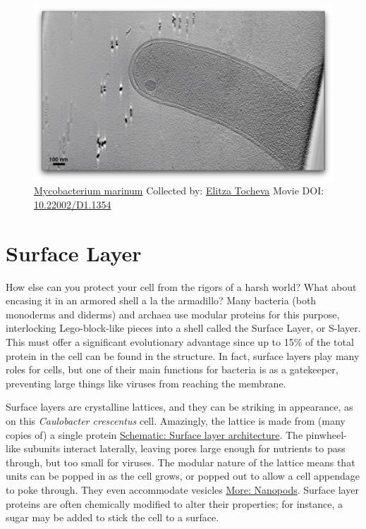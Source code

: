 \documentclass[]{tufte-book}
\begin{document}
\begin{figure}
\includegraphics{movie_stills/2_5} \caption[\protect\hyperlink{tree}{Mycobacterium marinum} Collected by:
\protect\hyperlink{elitza_tocheva}{Elitza Tocheva} Movie DOI:
\href{https://doi.org/10.22002/D1.1354}{10.22002/D1.1354}]{\protect\hyperlink{tree}{Mycobacterium marinum} Collected by:
\protect\hyperlink{elitza_tocheva}{Elitza Tocheva} Movie DOI:
\href{https://doi.org/10.22002/D1.1354}{10.22002/D1.1354}}\label{fig:2-5}
\end{figure}

\section{Surface Layer}\label{surface-layer}

How else can you protect your cell from the rigors of a harsh world?
What about encasing it in an armored shell a la the armadillo? Many
bacteria (both monoderms and diderms) and archaea use modular proteins
for this purpose, interlocking Lego-block-like pieces into a shell
called the Surface Layer, or S-layer. This must offer a significant
evolutionary advantage since up to 15\% of the total protein in the cell
can be found in the structure. In fact, surface layers play many roles
for cells, but one of their main functions for bacteria is as a
gatekeeper, preventing large things like viruses from reaching the
membrane.

Surface layers are crystalline lattices, and they can be striking in
appearance, as on this \emph{Caulobacter crescentus} cell. Amazingly,
the lattice is made from (many copies of) a single protein
\protect\hyperlink{Surface_layer_architecture}{Schematic: Surface layer
architecture}. The pinwheel-like subunits interact laterally, leaving
pores large enough for nutrients to pass through, but too small for
viruses. The modular nature of the lattice means that units can be
popped in as the cell grows, or popped out to allow a cell appendage to
poke through. They even accommodate vesicles
\protect\hyperlink{Nanopods}{More: Nanopods}. Surface layer proteins are
often chemically modified to alter their properties; for instance, a
sugar may be added to stick the cell to a surface.
\end{document}
